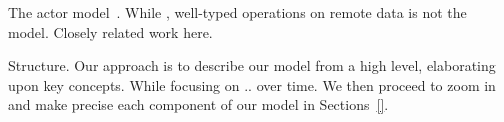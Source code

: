 \documentclass[preprint]{sigplanconf}
\theoremstyle{definition}
\theoremstyle{definition}
\begin{document}

The actor model~\cite{Actors, ScalaActors}. While , well-typed operations on
remote data is not the model.  Closely related work here.

Structure. Our approach is to describe our model from a high level,
elaborating upon key concepts. While focusing on .. over time. We then proceed
to zoom in and make precise each component of our model in Sections~\ref{}.




\end{document}
